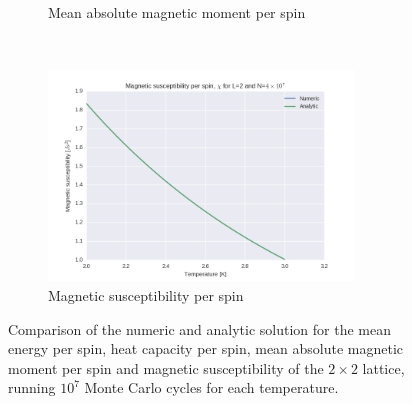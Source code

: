 \documentclass[a4paper, 10pt]{article}
\begin{document}
\begin{figure}[!ht]
\begin{subfigure}[H!]{0.5\textwidth}
        \caption{Mean absolute magnetic moment per spin}
    \end{subfigure}%
    ~ 
    \begin{subfigure}[H!]{0.5\textwidth}
        \centering
        \includegraphics[height=2.2in]{L2MagSus4e7.png}
        \caption{Magnetic susceptibility per spin}
    \end{subfigure}
    \caption{Comparison of the numeric and  analytic solution for the mean energy per spin, heat capacity per spin, mean absolute magnetic moment per spin and magnetic susceptibility of the $2 \times 2$ lattice, running $10^7$ Monte Carlo cycles for each temperature. }\label{fig:2x2_thermo}
\end{figure}
\end{document}
